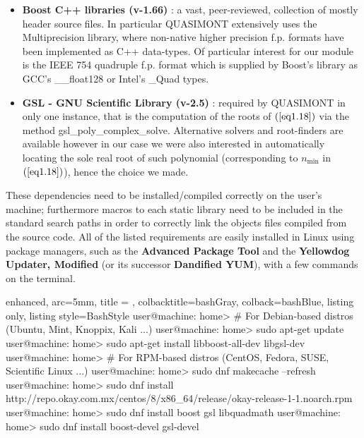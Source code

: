\documentclass[a4paper, twosided]{book}
\begin{document}
\begin{itemize}
    \item \color{poliDarkBlue} \textbf{Boost C++ libraries (v-1.66)} \color{black}\cite{boost}: a vast, peer-reviewed, collection of mostly header source files. In particular QUASIMONT extensively uses the \colorbox{poliGrayBlue}{Multiprecision} library, where non-native higher precision f.p. formats have been implemented as C++ data-types. Of particular interest for our module is the IEEE 754 quadruple f.p. format which is supplied by Boost's library as GCC's \colorbox{poliGrayBlue}{\_\_float128} or Intel's \colorbox{poliGrayBlue}{\_Quad} types.
    \item \color{poliDarkBlue} \textbf{GSL - GNU Scientific Library (v-2.5)} \color{black}\cite{gsl}: required by QUASIMONT in only one instance, that is the computation of the roots of $(\ref{eq1.18})$ via the method \colorbox{poliGrayBlue}{gsl\_poly\_complex\_solve}. Alternative solvers and root-finders are available however in our case we were also interested in automatically locating the sole real root of such polynomial (corresponding to $n_{\text{min}}$ in $(\ref{eq1.18})$), hence the choice we made.
\end{itemize}

\noindent
These dependencies need to be installed/compiled correctly on the user's machine; furthermore macros to each static library need to be included in the standard search paths in order to correctly link the objects files compiled from the source code. All of the listed requirements are easily installed in Linux using package managers, such as the \color{poliDarkBlue} \textbf{Advanced Package Tool} \color{black} and the \color{poliDarkBlue} \textbf{Yellowdog Updater, Modified} \color{black} (or its successor \color{poliDarkBlue} \textbf{Dandified YUM}\color{black}), with a few commands on the terminal.

\vspace{0.2cm}
\begin{tcblisting}{enhanced,
                   arc=5mm,
                   title = \color{black}{\large \ttfamily Installation of third-party libraries},
                   colbacktitle=bashGray,
                   colback=bashBlue,
                   listing only,
                   listing style=BashStyle}
user@machine: home> # For Debian-based distros (Ubuntu, Mint, Knoppix, Kali ...)
user@machine: home> sudo apt-get update
user@machine: home> sudo apt-get install libboost-all-dev libgsl-dev
user@machine: home> # For RPM-based distros (CentOS, Fedora, SUSE, Scientific Linux ...)
user@machine: home> sudo dnf makecache --refresh
user@machine: home> sudo dnf install http://repo.okay.com.mx/centos/8/x86_64/release/okay-release-1-1.noarch.rpm
user@machine: home> sudo dnf install boost gsl libquadmath
user@machine: home> sudo dnf install boost-devel gsl-devel
\end{tcblisting}
\vspace{0.3cm}
\end{document}
